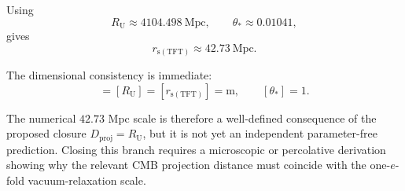 Using
\begin{equation}
    R_{\mathrm{U}}
    \approx
    4104.498\ \mathrm{Mpc},
    \qquad
    \theta_*
    \approx
    0.01041,
\end{equation}
gives
\begin{equation}
    r_{\mathrm{s(TFT)}}
    \approx
    42.73\ \mathrm{Mpc}.
\end{equation}

The dimensional consistency is immediate:
\begin{equation}
    [D_{\mathrm{proj}}]
    =
    [R_{\mathrm{U}}]
    =
    [r_{\mathrm{s(TFT)}}]
    =
    \mathrm{m},
    \qquad
    [\theta_*]=1.
\end{equation}

The numerical $42.73$ Mpc scale is therefore a well-defined consequence of the proposed closure $D_{\mathrm{proj}}=R_{\mathrm{U}}$, but it is not yet an independent parameter-free prediction. Closing this branch requires a microscopic or percolative derivation showing why the relevant CMB projection distance must coincide with the one-$e$-fold vacuum-relaxation scale.

